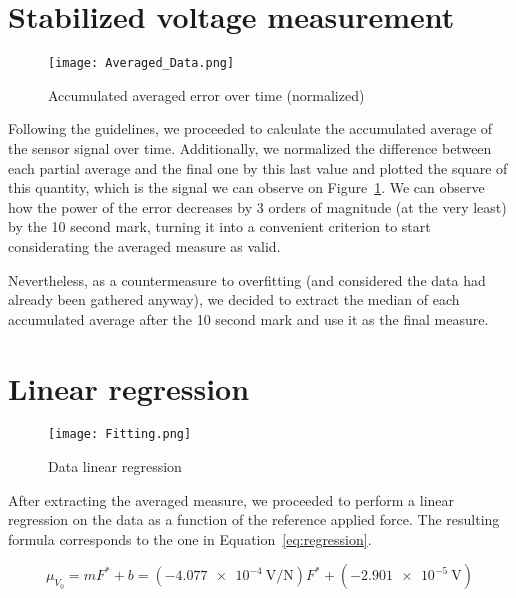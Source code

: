 \documentclass[12pt]{article}
\begin{document}
\section{Stabilized voltage measurement} \label{sec:stabilized_signal}

        \begin{figure}[!ht]
                \texttt{[image: Averaged\_Data.png]}
                \centering
                \caption{Accumulated averaged error over time (normalized)}
                \label{fig:averaged}
        \end{figure}

        Following the guidelines, we proceeded to calculate the accumulated average of the sensor signal over time. Additionally, we normalized the difference between each partial average and the final one by this last value and plotted the square of this quantity, which is the signal we can observe on Figure~\ref{fig:averaged}. We can observe how the power of the error decreases by 3 orders of magnitude (at the very least) by the 10 second mark, turning it into a convenient criterion to start considerating the averaged measure as valid.

        Nevertheless, as a countermeasure to overfitting (and considered the data had already been gathered anyway), we decided to extract the median of each accumulated average after the 10 second mark and use it as the final measure.

\section{Linear regression} \label{sec:lin_regression}

        \begin{figure}[!ht]
                \texttt{[image: Fitting.png]}
                \centering
                \caption{Data linear regression}
                \label{fig:regression}
        \end{figure}

        After extracting the averaged measure, we proceeded to perform a linear regression on the data as a function of the reference applied force. The resulting formula corresponds to the one in Equation~\ref{eq:regression}.

        \begin{equation} \label{eq:regression}
                \mu_{V_0} = m F^{*} + b = (\SI{-4.077e-4}{\volt\per\newton}) F^{*} + (\SI{-2.901e-5}{\volt})
        \end{equation}
\end{document}
